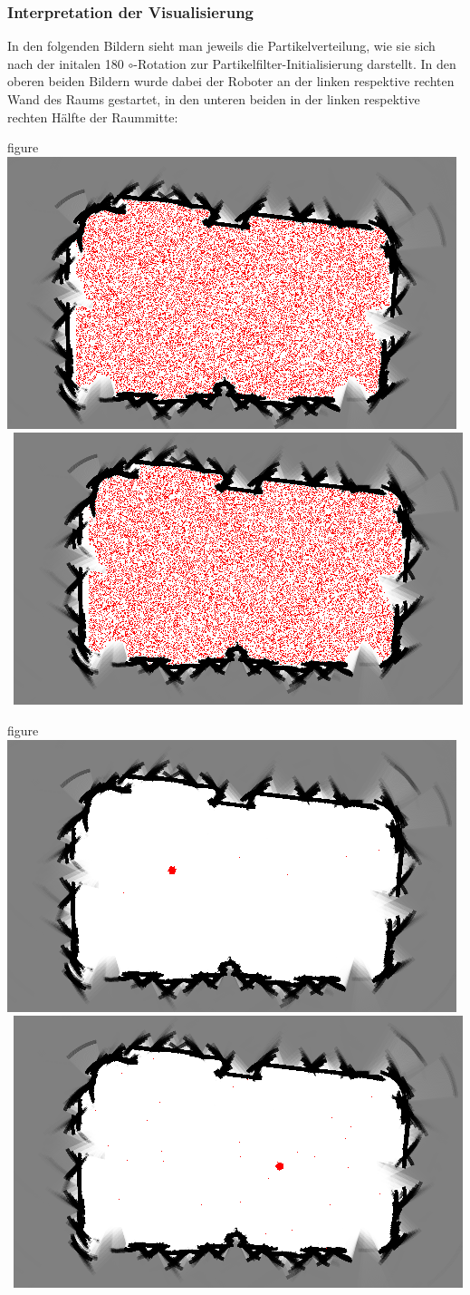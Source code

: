 \subsubsection{Interpretation der Visualisierung}
In den folgenden Bildern sieht man jeweils die Partikelverteilung, wie
sie sich nach der initalen 180 $\circ$-Rotation zur
Partikelfilter-Initialisierung darstellt. In den oberen beiden Bildern
wurde dabei der Roboter an der linken respektive rechten Wand des
Raums gestartet, in den unteren beiden in der linken respektive
rechten Hälfte der Raummitte:
\begin{nofloat}{figure}
 \includegraphics[width=0.5\linewidth]{bilder/visualisierung/visualisierung2}
 \
 \includegraphics[width=0.5\linewidth]{bilder/visualisierung/visualisierung3}
 \caption{Partikelverteilung im Partikelfilter bei Start nahe der Wände}
\end{nofloat}
\begin{nofloat}{figure}
 \includegraphics[width=0.5\linewidth]{bilder/visualisierung/visualisierung4}
 \
 \includegraphics[width=0.5\linewidth]{bilder/visualisierung/visualisierung5}
  \caption{Partikelverteilung im Partikelfilter bei Start in der Raummitte}
\end{nofloat} 

